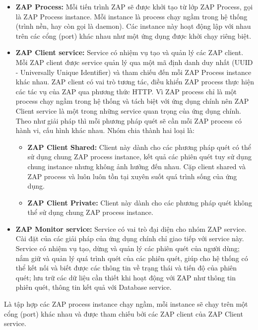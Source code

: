 \begin{itemize}
      \item \textbf{ZAP Process:} Mỗi tiến trình ZAP sẽ được khởi tạo từ lớp ZAP Process, gọi là ZAP Process instance.
            Mỗi instance là process chạy ngầm trong hệ thống (trình nền, hay còn gọi là daemon).
            Các instance này hoạt động lập với nhau trên các cổng (port) khác nhau như một ứng dụng được khởi chạy riêng biệt.
      \item \textbf{ZAP Client service:} Service có nhiệm vụ tạo và quản lý các ZAP client.
            Mỗi ZAP client được service quản lý qua một mã định danh duy nhất (UUID - Universally Unique Identifier) và tham chiếu đến mỗi ZAP Process instance khác nhau.
            ZAP client có vai trò tương tác, điều khiển ZAP process thực hiện các tác vụ của ZAP qua phương thức HTTP.
            Vì ZAP process chỉ là một process chạy ngầm trong hệ thống và tách biệt với ứng dụng chính nên ZAP Client service là một trong những service quan trọng của ứng dụng chính.
            Theo như giải pháp thì mỗi phương pháp quét sẽ cần mỗi ZAP process có hành vi, cấu hình khác nhau.
            Nhóm chia thành hai loại là:
            \begin{itemize}
                  \item \textbf{ZAP Client Shared:} Client này dành cho các phương pháp quét có thể sử dụng chung ZAP process instance, kết quả các phiên quét tuy sử dụng chung instance nhưng không ảnh hưởng đến nhau.
                        Cặp client shared và ZAP process và luôn luôn tồn tại xuyên suốt quá trình sống của ứng dụng.
                  \item \textbf{ZAP Client Private:} Client này dành cho các phương pháp quét không thể sử dụng chung ZAP process instance.
            \end{itemize}
      \item \textbf{ZAP Monitor service:} Service có vai trò đại diện cho nhóm ZAP service.
            Cài đặt của các giải pháp của ứng dụng chính chỉ giao tiếp với service này.
            Service có nhiệm vụ tạo, dừng và quản lý các phiên quét của người dùng; nắm giữ và quản lý quá trình quét của các phiên quét, giúp cho hệ thống có thể kết nối và biết được các thông tin về trạng thái và tiến độ của phiên quét; lưu trữ các dữ liệu cần thiết khi hoạt động với ZAP như thông tin phiên quét, thông tin kết quả với Database service.
\end{itemize}

\newpage
{}
\tab \tab Là tập hợp các ZAP process instance chạy ngầm, mỗi instance sẽ chạy trên một cổng (port) khác nhau và được tham chiếu bởi các ZAP client của ZAP Client service.
\par


